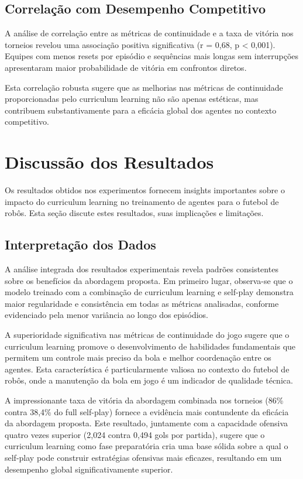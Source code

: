 \subsection{Correlação com Desempenho Competitivo}

A análise de correlação entre as métricas de continuidade e a taxa de vitória nos torneios revelou uma associação positiva significativa (r = 0,68, p < 0,001). Equipes com menos resets por episódio e sequências mais longas sem interrupções apresentaram maior probabilidade de vitória em confrontos diretos.

Esta correlação robusta sugere que as melhorias nas métricas de continuidade proporcionadas pelo curriculum learning não são apenas estéticas, mas contribuem substantivamente para a eficácia global dos agentes no contexto competitivo.

\section{Discussão dos Resultados}
\label{sec:discussao_resultados}

Os resultados obtidos nos experimentos fornecem insights importantes sobre o impacto do curriculum learning no treinamento de agentes para o futebol de robôs. Esta seção discute estes resultados, suas implicações e limitações.

\subsection{Interpretação dos Dados}

A análise integrada dos resultados experimentais revela padrões consistentes sobre os benefícios da abordagem proposta. Em primeiro lugar, observa-se que o modelo treinado com a combinação de curriculum learning e self-play demonstra maior regularidade e consistência em todas as métricas analisadas, conforme evidenciado pela menor variância ao longo dos episódios.

A superioridade significativa nas métricas de continuidade do jogo sugere que o curriculum learning promove o desenvolvimento de habilidades fundamentais que permitem um controle mais preciso da bola e melhor coordenação entre os agentes. Esta característica é particularmente valiosa no contexto do futebol de robôs, onde a manutenção da bola em jogo é um indicador de qualidade técnica.

A impressionante taxa de vitória da abordagem combinada nos torneios (86\% contra 38,4\% do full self-play) fornece a evidência mais contundente da eficácia da abordagem proposta. Este resultado, juntamente com a capacidade ofensiva quatro vezes superior (2,024 contra 0,494 gols por partida), sugere que o curriculum learning como fase preparatória cria uma base sólida sobre a qual o self-play pode construir estratégias ofensivas mais eficazes, resultando em um desempenho global significativamente superior.

